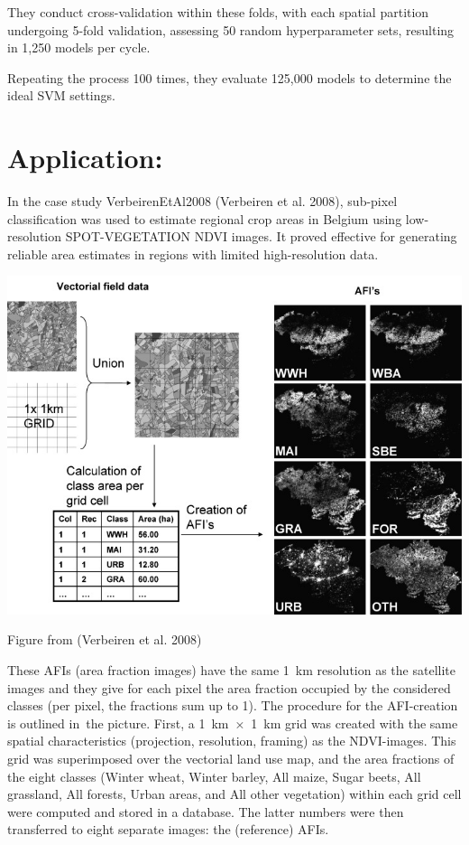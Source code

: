 \documentclass[
  letterpaper,
  DIV=11,
  numbers=noendperiod]{scrreprt}
\begin{document}
They conduct cross-validation within these folds, with each spatial
partition undergoing 5-fold validation, assessing 50 random
hyperparameter sets, resulting in 1,250 models per cycle.

Repeating the process 100 times, they evaluate 125,000 models to
determine the ideal SVM settings.


\chapter{Application:}\label{application-4}

In the case study VerbeirenEtAl2008 (Verbeiren et al. 2008), sub-pixel
classification was used to estimate regional crop areas in Belgium using
low-resolution SPOT-VEGETATION NDVI images. It proved effective for
generating reliable area estimates in regions with limited
high-resolution data.

\includegraphics{sub-pixel.png}

Figure from (Verbeiren et al. 2008)

These AFIs (area fraction images) have the same 1~km resolution as the
satellite images and they give for each pixel the area fraction occupied
by the considered classes (per pixel, the fractions sum up to 1). The
procedure for the AFI-creation is outlined in~the picture. First, a
1~km~×~1~km grid was created with the same spatial characteristics
(projection, resolution, framing) as the NDVI-images. This grid was
superimposed over the vectorial land use map, and the area fractions of
the eight classes (Winter wheat, Winter barley, All maize, Sugar beets,
All grassland, All forests, Urban areas, and All other vegetation)
within each grid cell were computed and stored in a database. The latter
numbers were then transferred to eight separate images: the (reference)
AFIs.
\end{document}
